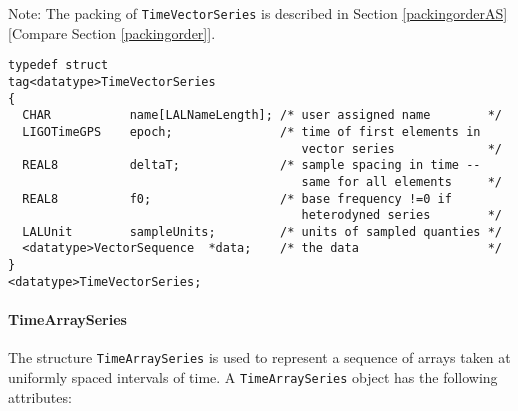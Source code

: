 \documentclass[]{ligodcc}
\renewcommand{\texttt}[1]{{\ttfamily\color{blue}#1}}
\begin{document}
Note: The packing of {\tt TimeVectorSeries} is described in Section
\ref{packingorderAS} [Compare Section \ref{packingorder}].

{\footnotesize
\begin{verbatim}
typedef struct
tag<datatype>TimeVectorSeries
{
  CHAR           name[LALNameLength]; /* user assigned name        */
  LIGOTimeGPS    epoch;               /* time of first elements in
                                         vector series             */
  REAL8          deltaT;              /* sample spacing in time -- 
                                         same for all elements     */
  REAL8          f0;                  /* base frequency !=0 if 
                                         heterodyned series        */
  LALUnit        sampleUnits;         /* units of sampled quanties */
  <datatype>VectorSequence  *data;    /* the data                  */
}
<datatype>TimeVectorSeries;
\end{verbatim}}

\paragraph{{\texttt {TimeArraySeries}} \\}

The structure {\tt TimeArraySeries} is used to represent a sequence of
arrays taken at uniformly spaced intervals of time. A {\tt TimeArraySeries}
object has the following attributes:
\end{document}

